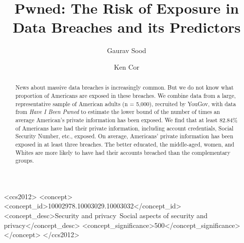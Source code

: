 \documentclass[sigconf]{acmart}
\begin{document}

%
\title[Pwned]{Pwned: The Risk of Exposure in Data Breaches and its Predictors}

%
\author{Gaurav Sood}
\authornotemark[1]
\affiliation{%
  \institution{}
}

\author{Ken Cor}
\authornotemark[2]
\affiliation{%
  \institution{The University of Alberta}
  \city{Edmonton}
  \country{Canada}
}
%
\renewcommand{\shortauthors}{Sood and Cor}

%
\begin{abstract}
News about massive data breaches is increasingly common. But we do not know what proportion of Americans are exposed in these breaches. We combine data from a large, representative sample of American adults (n = 5,000), recruited by YouGov, with data from \textit{Have I Been Pwned} to estimate the lower bound of the number of times an average American's private information has been exposed. We find that at least 82.84\% of Americans have had their private information, including account credentials, Social Security Number, etc., exposed. On average, Americans' private information has been exposed in at least three breaches. The better educated, the middle-aged, women, and Whites are more likely to have had their accounts breached than the complementary groups.
\end{abstract}

%
%
\begin{CCSXML}
<ccs2012>
<concept>
<concept_id>10002978.10003029.10003032</concept_id>
<concept_desc>Security and privacy~Social aspects of security and privacy</concept_desc>
<concept_significance>500</concept_significance>
</concept>
</ccs2012>
\end{CCSXML}
\end{document}
